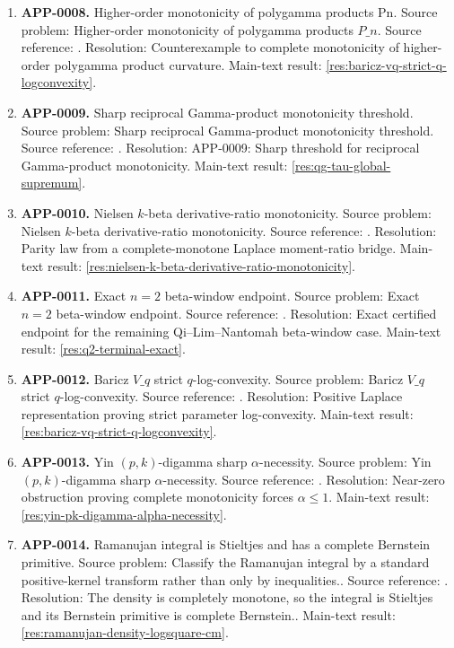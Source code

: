 \begin{enumerate}[leftmargin=*]
\item \textbf{APP-0008.} Higher-order monotonicity of polygamma products Pn.  Source problem: Higher-order monotonicity of polygamma products \(P\_n\). Source reference: \cite{app-app-0008-source}. Resolution: Counterexample to complete monotonicity of higher-order polygamma product curvature. Main-text result: \ref{res:baricz-vq-strict-q-logconvexity}.
\item \textbf{APP-0009.} Sharp reciprocal Gamma-product monotonicity threshold.  Source problem: Sharp reciprocal Gamma-product monotonicity threshold. Source reference: \cite{app-app-0009-source}. Resolution: APP-0009: Sharp threshold for reciprocal Gamma-product monotonicity. Main-text result: \ref{res:qg-tau-global-supremum}.
\item \textbf{APP-0010.} Nielsen \(k\)-beta derivative-ratio monotonicity.  Source problem: Nielsen \(k\)-beta derivative-ratio monotonicity. Source reference: \cite{app-app-0010-source}. Resolution: Parity law from a complete-monotone Laplace moment-ratio bridge. Main-text result: \ref{res:nielsen-k-beta-derivative-ratio-monotonicity}.
\item \textbf{APP-0011.} Exact \(n=2\) beta-window endpoint.  Source problem: Exact \(n=2\) beta-window endpoint. Source reference: \cite{app-app-0011-source}. Resolution: Exact certified endpoint for the remaining Qi--Lim--Nantomah beta-window case. Main-text result: \ref{res:q2-terminal-exact}.
\item \textbf{APP-0012.} Baricz \(V\_q\) strict \(q\)-log-convexity.  Source problem: Baricz \(V\_q\) strict \(q\)-log-convexity. Source reference: \cite{app-app-0012-source}. Resolution: Positive Laplace representation proving strict parameter log-convexity. Main-text result: \ref{res:baricz-vq-strict-q-logconvexity}.
\item \textbf{APP-0013.} Yin \((p,k)\)-digamma sharp \(\alpha\)-necessity.  Source problem: Yin \((p,k)\)-digamma sharp \(\alpha\)-necessity. Source reference: \cite{app-app-0013-source}. Resolution: Near-zero obstruction proving complete monotonicity forces \(\alpha\le1\). Main-text result: \ref{res:yin-pk-digamma-alpha-necessity}.
\item \textbf{APP-0014.} Ramanujan integral is Stieltjes and has a complete Bernstein primitive.  Source problem: Classify the Ramanujan integral by a standard positive-kernel transform rather than only by inequalities.. Source reference: \cite{app-app-0014-source}. Resolution: The density is completely monotone, so the integral is Stieltjes and its Bernstein primitive is complete Bernstein.. Main-text result: \ref{res:ramanujan-density-logsquare-cm}.

\end{enumerate}
